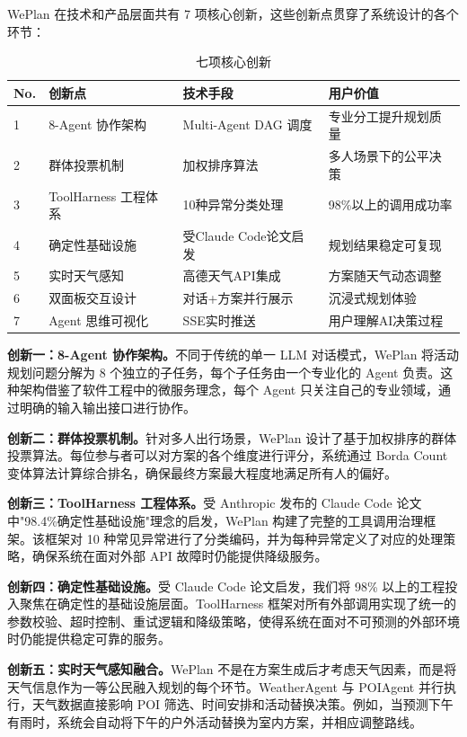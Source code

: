 \documentclass[12pt,a4paper]{ctexart}
\begin{document}
WePlan 在技术和产品层面共有 7 项核心创新，这些创新点贯穿了系统设计的各个环节：

\begin{table}[H]
\centering
\caption{七项核心创新}
\label{tab:innovations}
\renewcommand{\arraystretch}{1.5}
{\small
\begin{tabular}{p{0.5cm} p{3cm} p{3.5cm} p{5cm}}
\toprule
\textbf{No.} & \textbf{创新点} & \textbf{技术手段} & \textbf{用户价值} \\
\midrule
1 & 8-Agent 协作架构 & Multi-Agent DAG 调度 & 专业分工提升规划质量 \\
2 & 群体投票机制 & 加权排序算法 & 多人场景下的公平决策 \\
3 & ToolHarness 工程体系 & 10种异常分类处理 & 98\%以上的调用成功率 \\
4 & 确定性基础设施 & 受Claude Code论文启发 & 规划结果稳定可复现 \\
5 & 实时天气感知 & 高德天气API集成 & 方案随天气动态调整 \\
6 & 双面板交互设计 & 对话+方案并行展示 & 沉浸式规划体验 \\
7 & Agent 思维可视化 & SSE实时推送 & 用户理解AI决策过程 \\
\bottomrule
\end{tabular}
}
\end{table}

\textbf{创新一：8-Agent 协作架构。}不同于传统的单一 LLM 对话模式，WePlan 将活动规划问题分解为 8 个独立的子任务，每个子任务由一个专业化的 Agent 负责。这种架构借鉴了软件工程中的微服务理念，每个 Agent 只关注自己的专业领域，通过明确的输入输出接口进行协作。

\textbf{创新二：群体投票机制。}针对多人出行场景，WePlan 设计了基于加权排序的群体投票算法。每位参与者可以对方案的各个维度进行评分，系统通过 Borda Count 变体算法计算综合排名，确保最终方案最大程度地满足所有人的偏好。

\textbf{创新三：ToolHarness 工程体系。}受 Anthropic 发布的 Claude Code 论文中"98.4\%确定性基础设施"理念的启发，WePlan 构建了完整的工具调用治理框架。该框架对 10 种常见异常进行了分类编码，并为每种异常定义了对应的处理策略，确保系统在面对外部 API 故障时仍能提供降级服务。

\textbf{创新四：确定性基础设施。}受 Claude Code 论文启发，我们将 98\% 以上的工程投入聚焦在确定性的基础设施层面。ToolHarness 框架对所有外部调用实现了统一的参数校验、超时控制、重试逻辑和降级策略，使得系统在面对不可预测的外部环境时仍能提供稳定可靠的服务。

\textbf{创新五：实时天气感知融合。}WePlan 不是在方案生成后才考虑天气因素，而是将天气信息作为一等公民融入规划的每个环节。WeatherAgent 与 POIAgent 并行执行，天气数据直接影响 POI 筛选、时间安排和活动替换决策。例如，当预测下午有雨时，系统会自动将下午的户外活动替换为室内方案，并相应调整路线。
\end{document}
